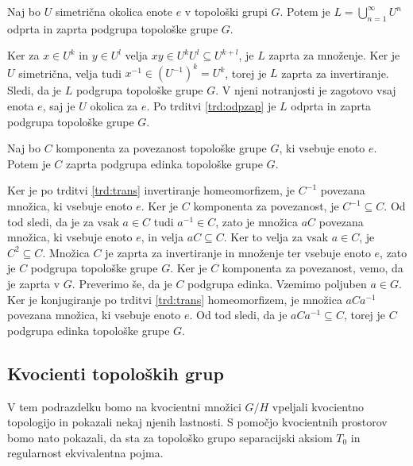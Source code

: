 \documentclass[mat1]{fmfdelo}
\begin{document}
\begin{trditev}\label{trd:podgrupaunija}
Naj bo $U$ simetrična okolica enote $e$ v topološki grupi $G$. Potem je $L = \bigcup_{n=1}^{\infty} U^n$ odprta in zaprta podgrupa topološke grupe $G$.
\end{trditev}

\begin{dokaz}
Ker za $x \in U^k$ in $y \in U^l$ velja $xy \in U^kU^l \subseteq U^{k+l}$, je $L$ zaprta za množenje. Ker je $U$ simetrična, velja tudi $x^{-1} \in (U^{-1})^k = U^k$, torej je $L$ zaprta za invertiranje. Sledi, da je $L$ podgrupa topološke grupe $G$. V njeni notranjosti je zagotovo vsaj enota $e$, saj je $U$ okolica za $e$. Po trditvi \ref{trd:odpzap} je $L$ odprta in zaprta podgrupa topološke grupe $G$.
\end{dokaz}

\begin{trditev}\label{trd:povedinka}
Naj bo $C$ komponenta za povezanost topološke grupe $G$, ki vsebuje enoto $e$. Potem je $C$ zaprta podgrupa edinka topološke grupe $G$.
\end{trditev}

\begin{dokaz}
Ker je po trditvi \ref{trd:trans} invertiranje homeomorfizem, je $C^{-1}$ povezana množica, ki vsebuje enoto $e$. Ker je $C$ komponenta za povezanost, je $C^{-1} \subseteq C$. Od tod sledi, da je za vsak $a \in C$ tudi $a^{-1} \in C$, zato je množica $aC$ povezana množica, ki vsebuje enoto $e$, in velja $aC \subseteq C$. Ker to velja za vsak $a \in C$, je $C^2 \subseteq C$. Množica $C$ je zaprta za invertiranje in množenje ter vsebuje enoto $e$, zato je $C$ podgrupa topološke grupe $G$. Ker je $C$ komponenta za povezanost, vemo, da je zaprta v $G$. Preverimo še, da je $C$ podgrupa edinka. Vzemimo poljuben $a \in G$. Ker je konjugiranje po trditvi \ref{trd:trans} homeomorfizem, je množica $aCa^{-1}$ povezana množica, ki vsebuje enoto $e$. Od tod sledi, da je $aCa^{-1} \subseteq C$, torej je $C$ podgrupa edinka topološke grupe $G$.
\end{dokaz}

\subsection{Kvocienti topoloških grup}
V tem podrazdelku bomo na kvocientni množici $G/H$ vpeljali kvocientno topologijo in pokazali nekaj njenih lastnosti. S pomočjo kvocientnih prostorov bomo nato pokazali, da sta za topološko grupo separacijski aksiom $T_0$ in regularnost ekvivalentna pojma.
\end{document}
